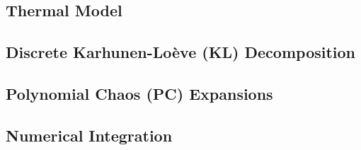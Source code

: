 \subsection{Thermal Model} 


\subsection{Discrete Karhunen-Lo\`{e}ve (KL) Decomposition} 


\subsection{Polynomial Chaos (PC) Expansions} 


\subsection{Numerical Integration} 

